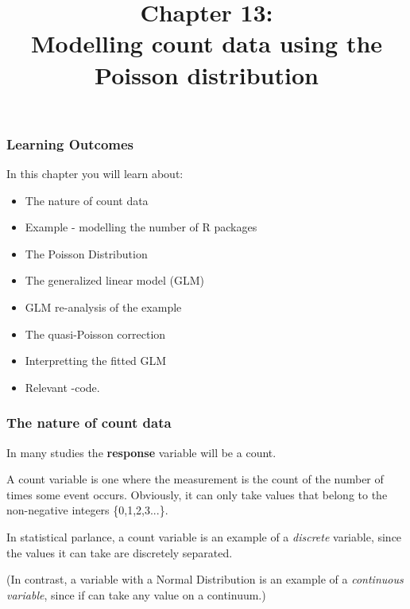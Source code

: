 \documentclass{beamer}\usepackage[]{graphicx}\usepackage[]{xcolor}
\begin{document}
\newcommand{\thechapter}{13}
\title{Chapter \thechapter: \\ Modelling count data using the Poisson distribution}




\begin{frame}
\titlepage
\end{frame}


\begin{frame}[t]
\frametitle{Learning Outcomes}
In this chapter you will learn about:
\begin{center}
\vspace{16pt}
\begin{minipage}{0.9\textwidth}
  \begin{itemize}
  \item The nature of count data
  \item Example - modelling the number of R packages
  \item The Poisson Distribution
  \item The generalized linear model (GLM)
  \item GLM re-analysis of the example
  \item The quasi-Poisson correction
  \item Interpretting the fitted GLM
  \item Relevant -code.
  \end{itemize}
\end{minipage}
\end{center}

\end{frame}





\begin{frame}[fragile]
\frametitle{The nature of count data}
In many studies the {\bf response} variable will be a count.
\bigskip

A count variable is one where the measurement is the count of the number of times
some event occurs.
Obviously, it can only take values that belong to the non-negative integers
\{0,1,2,3...\}.
\bigskip

In statistical parlance, a count variable is an example of a {\em discrete} variable,
since the values it can take are discretely separated.
\bigskip

(In contrast,
a variable with a Normal Distribution is an example of a {\em continuous variable},
since if can take any value on a continuum.)
\end{frame}
\end{document}
